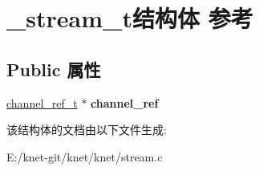 \hypertarget{struct__stream__t}{}\section{\+\_\+stream\+\_\+t结构体 参考}
\label{struct__stream__t}
\subsection*{Public 属性}
\begin{DoxyCompactItemize}
\item 
\hypertarget{struct__stream__t_af40daebca0524439f054c072a68b42a8}{}\hyperlink{struct__channel__ref__t}{channel\+\_\+ref\+\_\+t} $\ast$ {\bfseries channel\+\_\+ref}\label{struct__stream__t_af40daebca0524439f054c072a68b42a8}

\end{DoxyCompactItemize}


该结构体的文档由以下文件生成\+:\begin{DoxyCompactItemize}
\item 
E\+:/knet-\/git/knet/knet/stream.\+c\end{DoxyCompactItemize}

